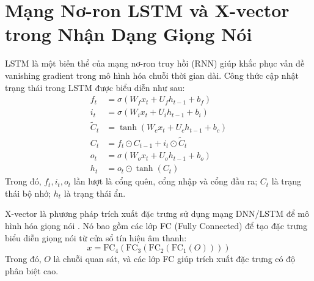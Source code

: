 \documentclass{article}
\begin{document}
\section{Mạng Nơ-ron LSTM và X-vector trong Nhận Dạng Giọng Nói}
LSTM là một biến thể của mạng nơ-ron truy hồi (RNN) giúp khắc phục vấn đề vanishing gradient trong mô hình hóa chuỗi thời gian dài. Công thức cập nhật trạng thái trong LSTM được biểu diễn như sau:
\begin{align}
    f_t         & = \sigma(W_f x_t + U_f h_{t-1} + b_f)       \\
    i_t         & = \sigma(W_i x_t + U_i h_{t-1} + b_i)       \\
    \tilde{C}_t & = \tanh(W_c x_t + U_c h_{t-1} + b_c)        \\
    C_t         & = f_t \odot C_{t-1} + i_t \odot \tilde{C}_t \\
    o_t         & = \sigma(W_o x_t + U_o h_{t-1} + b_o)       \\
    h_t         & = o_t \odot \tanh(C_t)
\end{align}
Trong đó, $f_t, i_t, o_t$ lần lượt là cổng quên, cổng nhập và cổng đầu ra; $C_t$ là trạng thái bộ nhớ; $h_t$ là trạng thái ẩn.

X-vector là phương pháp trích xuất đặc trưng sử dụng mạng DNN/LSTM để mô hình hóa giọng nói \cite{Snyder2018}. Nó bao gồm các lớp FC (Fully Connected) để tạo đặc trưng biểu diễn giọng nói từ cửa sổ tín hiệu âm thanh:
\begin{equation}
    x = \text{FC}_4(\text{FC}_3(\text{FC}_2(\text{FC}_1(O))))
\end{equation}
Trong đó, $O$ là chuỗi quan sát, và các lớp FC giúp trích xuất đặc trưng có độ phân biệt cao.
\end{document}
